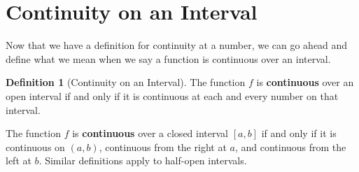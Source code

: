 \documentclass[10pt,oneside,]{book}
\newcommand{\terminology}[1]{\textbf{#1}}
\theoremstyle{plain}
\theoremstyle{definition}
\newtheorem{definition}[theorem]{Definition}
\numberwithin{equation}{section}
\newcommand{\cinterval}[2]{\left[#1,#2\right]}
\newcommand{\ointerval}[2]{\left(#1,#2\right)}
\begin{document}
\section[Continuity on an Interval]{Continuity on an Interval}\label{section-continuity-on-an-interval}
Now that we have a definition for continuity at a number, we can go ahead and define what we mean when we say a function is continuous over an interval.%
\begin{definition}[Continuity on an Interval]\label{definition-continuity-on-an-interval}
The function \(f\) is \terminology{continuous} over an open interval if and only if it is continuous at each and every number on that interval.%
\par
The function \(f\) is \terminology{continuous} over a closed interval \(\cinterval{a}{b}\) if and only if it is continuous on \(\ointerval{a}{b}\), continuous from the right at \(a\), and continuous from the left at \(b\). Similar definitions apply to half-open intervals.%
\end{definition}
\typeout{************************************************}
\typeout{************************************************}
\end{document}
